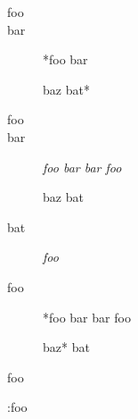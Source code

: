 
\def\mytitle{Definition Lists}


\begin{description}
\item[foo]

\item[bar]

*foo bar

baz bat*

\item[foo]

\item[bar]

\emph{foo bar
bar foo}

baz bat

\item[bat]

\emph{foo}

\item[foo]

*foo bar
bar foo

baz* bat
\end{description}

foo

:foo




